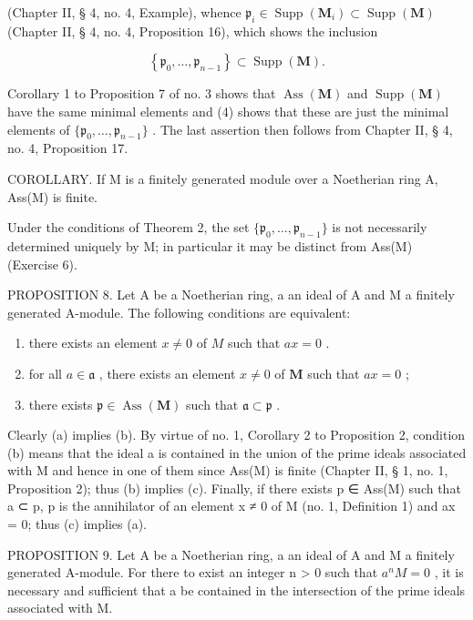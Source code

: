 (Chapter II, § 4, no. 4, Example), whence \(\mathfrak{p}_i \in \operatorname{Supp}(\mathbf{M}_i) \subset \operatorname{Supp}(\mathbf{M})\) (Chapter II, § 4, no. 4, Proposition 16), which shows the inclusion

\[
\left\{\mathfrak {p} _ {0}, \dots , \mathfrak {p} _ {n - 1} \right\} \subset \operatorname{Supp} (\mathbf {M}).
\]

Corollary 1 to Proposition 7 of no. 3 shows that \(\operatorname{Ass}(\mathbf{M})\) and \(\operatorname{Supp}(\mathbf{M})\) have the same minimal elements and (4) shows that these are just the minimal elements of \(\{\mathfrak{p}_0, \ldots, \mathfrak{p}_{n-1}\}\) . The last assertion then follows from Chapter II, § 4, no. 4, Proposition 17.

COROLLARY. If M is a finitely generated module over a Noetherian ring A, Ass(M) is finite.

Under the conditions of Theorem 2, the set \(\{\mathfrak{p}_0,\ldots ,\mathfrak{p}_{n - 1}\}\) is not necessarily determined uniquely by M; in particular it may be distinct from Ass(M) (Exercise 6).

PROPOSITION 8. Let A be a Noetherian ring, a an ideal of A and M a finitely generated A-module. The following conditions are equivalent:

\begin{enumerate}
\def\labelenumi{(\alph{enumi})}
\item
  there exists an element \(x \neq 0\) of \(M\) such that \(ax = 0\) .
\item
  for all \(a \in \mathfrak{a}\) , there exists an element \(x \neq 0\) of \(\mathbf{M}\) such that \(ax = 0\) ;
\item
  there exists \(\mathfrak{p} \in \operatorname{Ass}(\mathbf{M})\) such that \(\mathfrak{a} \subset \mathfrak{p}\) .
\end{enumerate}

Clearly (a) implies (b). By virtue of no. 1, Corollary 2 to Proposition 2, condition (b) means that the ideal a is contained in the union of the prime ideals associated with M and hence in one of them since Ass(M) is finite (Chapter II, § 1, no. 1, Proposition 2); thus (b) implies (c). Finally, if there exists p ∈ Ass(M) such that a ⊂ p, p is the annihilator of an element x ≠ 0 of M (no. 1, Definition 1) and ax = 0; thus (c) implies (a).

PROPOSITION 9. Let A be a Noetherian ring, a an ideal of A and M a finitely generated A-module. For there to exist an integer n \textgreater{} 0 such that \(a^{n}M = 0\) , it is necessary and sufficient that a be contained in the intersection of the prime ideals associated with M.

